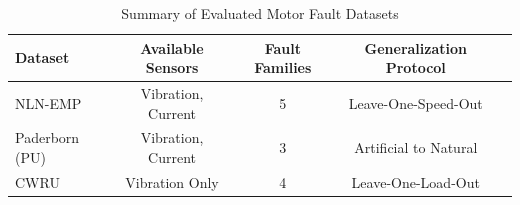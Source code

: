 \begin{table}[h]
\centering
\caption{Summary of Evaluated Motor Fault Datasets}
\label{tab:datasets}
\begin{tabular}{lcccc}
\hline
\textbf{Dataset} & \textbf{Available Sensors} & \textbf{Fault Families} & \textbf{Generalization Protocol} \\
\hline
NLN-EMP & Vibration, Current & 5 & Leave-One-Speed-Out \\
Paderborn (PU) & Vibration, Current & 3 & Artificial to Natural \\
CWRU & Vibration Only & 4 & Leave-One-Load-Out \\
\hline
\end{tabular}
\end{table}
